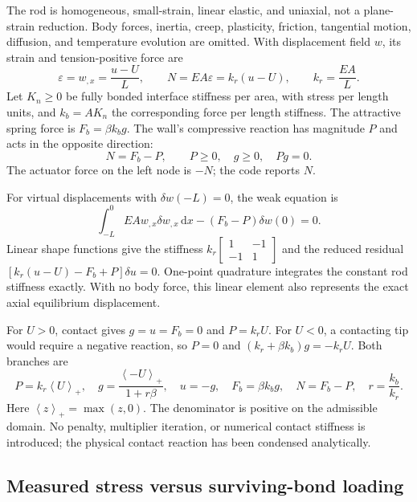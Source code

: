 \documentclass[11pt,a4paper]{article}
\newcommand{\dd}{\mathrm{d}}
\newcommand{\pos}[1]{\left\langle #1\right\rangle_+}
\begin{document}
The rod is homogeneous, small-strain, linear elastic, and uniaxial, not a
plane-strain reduction. Body forces, inertia, creep, plasticity, friction,
tangential motion, diffusion, and temperature evolution are omitted. With
displacement field $w$, its strain and tension-positive force are
\begin{equation}
 \varepsilon=w_{,x}=\frac{u-U}{L},\qquad
 N=EA\varepsilon=k_r(u-U),\qquad k_r=\frac{EA}{L}.
\end{equation}
Let $K_n\geq0$ be fully bonded interface stiffness per area, with stress per
length units, and $k_b=AK_n$ the corresponding force per length stiffness.
The attractive spring force is $F_b=\beta k_b g$. The wall's compressive
reaction has magnitude $P$ and acts in the opposite direction:
\begin{equation}
 N=F_b-P,\qquad P\geq0,\quad g\geq0,\quad Pg=0.
 \label{eq:contact}
\end{equation}
The actuator force on the left node is $-N$; the code reports $N$.

For virtual displacements with $\delta w(-L)=0$, the weak equation is
\begin{equation}
 \int_{-L}^{0}EA w_{,x}\delta w_{,x}\,\dd x-(F_b-P)\delta w(0)=0.
\end{equation}
Linear shape functions give the stiffness
$k_r\begin{bmatrix}1&-1\\-1&1\end{bmatrix}$ and the reduced residual
$[k_r(u-U)-F_b+P]\delta u=0$. One-point quadrature integrates the constant
rod stiffness exactly. With no body force, this linear element also represents
the exact axial equilibrium displacement.

For $U>0$, contact gives $g=u=F_b=0$ and $P=k_rU$. For $U<0$, a contacting
tip would require a negative reaction, so $P=0$ and
$(k_r+\beta k_b)g=-k_rU$. Both branches are
\begin{equation}
 \boxed{P=k_r\pos{U},\quad g=\frac{\pos{-U}}{1+r\beta},\quad
 u=-g,\quad F_b=\beta k_b g,\quad N=F_b-P,\quad r=\frac{k_b}{k_r}.}
 \label{eq:mechanics}
\end{equation}
Here $\pos{z}=\max(z,0)$. The denominator is positive on the admissible
domain. No penalty, multiplier iteration, or numerical contact stiffness is
introduced; the physical contact reaction has been condensed analytically.

\subsection{Measured stress versus surviving-bond loading}
\end{document}
